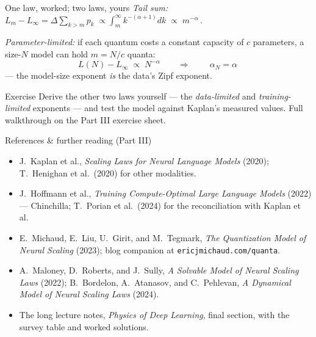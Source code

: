 \documentclass[11pt]{beamer}
\begin{document}
\begin{frame}{One law, worked; two laws, yours}
  \emph{Tail sum:} \ $\displaystyle L_m - L_\infty = \Delta\!\!\sum_{k>m}
  p_k \;\propto \int_m^\infty\!\! k^{-(\alpha+1)} dk \;\propto\;
  m^{-\alpha}\,.$
  \vspace{1mm}

  \emph{Parameter-limited:} if each quantum costs a constant capacity of
  $c$ parameters, a size-$N$ model can hold $m = N/c$ quanta:
  \[
    L(N) - L_\infty \;\propto\; N^{-\alpha}
    \qquad\Longrightarrow\qquad \boxed{\ \alpha_N = \alpha\ }
  \]
  --- the model-size exponent \emph{is} the data's Zipf exponent.
  \vspace{2mm}

  \begin{block}{Exercise}
    Derive the other two laws yourself --- the \emph{data-limited} and
    \emph{training-limited} exponents --- and test the model against
    Kaplan's measured values. Full walkthrough on the Part III exercise
    sheet.
  \end{block}
\end{frame}

\begin{frame}{References \& further reading (Part III)}
  \small
  \begin{itemize}
    \item J.~Kaplan et al., \emph{Scaling Laws for Neural Language
      Models} (2020); T.~Henighan et al.\ (2020) for other modalities.
    \item J.~Hoffmann et al., \emph{Training Compute-Optimal Large
      Language Models} (2022) --- Chinchilla; T.~Porian et al.\ (2024)
      for the reconciliation with Kaplan et al.
    \item E.~Michaud, E.~Liu, U.~Girit, and M.~Tegmark, \emph{The
      Quantization Model of Neural Scaling} (2023); blog companion at
      {\footnotesize \texttt{ericjmichaud.com/quanta}}.
    \item A.~Maloney, D.~Roberts, and J.~Sully, \emph{A Solvable Model
      of Neural Scaling Laws} (2022); B.~Bordelon, A.~Atanasov, and
      C.~Pehlevan, \emph{A Dynamical Model of Neural Scaling Laws}
      (2024).
    \item The long lecture notes, \emph{Physics of Deep Learning},
      final section, with the survey table and worked solutions.
  \end{itemize}
\end{frame}
\end{document}
